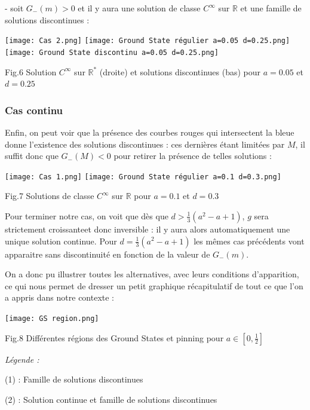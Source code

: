 \documentclass{article}
\begin{document}
\noindent - soit $G_-(m)>0$ et il y aura une solution de classe $C^{\infty}$ sur $\mathbb{R}$ et une famille de solutions discontinues : 

\begin{center}
\texttt{[image: Cas 2.png]}
\texttt{[image: Ground State régulier a=0.05 d=0.25.png]}
\texttt{[image: Ground State discontinu a=0.05 d=0.25.png]}
 
Fig.6 Solution $C^{\infty}$ sur $\mathbb{R}^*$ (droite) et solutions discontinues (bas) pour $a=0.05$ et $d=0.25$
\end{center}

\subsubsection{Cas continu}
Enfin, on peut voir que la présence des courbes rouges qui intersectent la bleue donne l'existence des solutions discontinues : ces dernières étant limitées par $M$, il suffit donc que $G_-(M) <0$ pour retirer la présence de telles solutions : 

\begin{center}
\texttt{[image: Cas 1.png]}
\texttt{[image: Ground State régulier a=0.1 d=0.3.png]}

Fig.7 Solutions de classe $C^{\infty}$ sur $\mathbb{R}$ pour $a=0.1$ et $d=0.3$
\end{center}

Pour terminer notre cas, on voit que dès que $d>\frac{1}{3}(a^2-a+1)$, $g$ sera strictement croissanteet donc inversible : il y aura alors automatiquement une unique solution continue. Pour $d = \frac{1}{3}(a^2-a+1)$ les mêmes cas précédents vont apparaitre sans discontinuité en fonction de la valeur de $G_-(m)$. \newline

On a donc pu illustrer toutes les alternatives, avec leurs conditions d'apparition, ce qui nous permet de dresser un petit graphique récapitulatif de tout ce que l'on a appris dans notre contexte : 

\begin{center}
\texttt{[image: GS region.png]}

Fig.8 Différentes régions des Ground States et pinning pour $a\in [0,\frac{1}{2}]$
\end{center} 

\noindent \textit{Légende :}

(1) : Famille de solutions discontinues

(2) : Solution continue et famille de solutions discontinues
\end{document}
